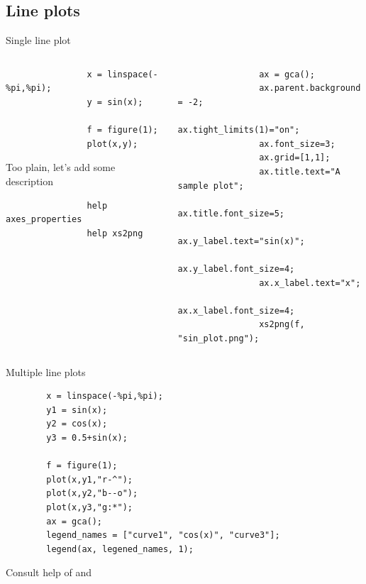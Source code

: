\subsection{Line plots}
\begin{frame}[fragile]{Single line plot}
    \begin{columns}
        \begin{column}{0.5\linewidth}
            \begin{lstlisting}
                x = linspace(-%pi,%pi);
                y = sin(x);
                
                f = figure(1);
                plot(x,y);
            \end{lstlisting}
            \vspace{1em}
            Too plain, let's add some description
            \begin{lstlisting}
                help axes_properties
                help xs2png
            \end{lstlisting}
        \end{column}
        \begin{column}{0.5\linewidth}
            \begin{lstlisting}
                ax = gca();
                ax.parent.background = -2;
                ax.tight_limits(1)="on";
                ax.font_size=3;
                ax.grid=[1,1];
                ax.title.text="A sample plot";
                ax.title.font_size=5;
                ax.y_label.text="sin(x)";
                ax.y_label.font_size=4;
                ax.x_label.text="x";
                ax.x_label.font_size=4;
                xs2png(f, "sin_plot.png");
            \end{lstlisting}
        \end{column}
    \end{columns}
\end{frame}

\begin{frame}[fragile]{Multiple line plots}
    \begin{lstlisting}
        x = linspace(-%pi,%pi);
        y1 = sin(x);
        y2 = cos(x);
        y3 = 0.5+sin(x);
        
        f = figure(1);
        plot(x,y1,"r-^");
        plot(x,y2,"b--o");
        plot(x,y3,"g:*");
        ax = gca();
        legend_names = ["curve1", "cos(x)", "curve3"];
        legend(ax, legened_names, 1);
    \end{lstlisting}
    Consult help of  and 
\end{frame}

